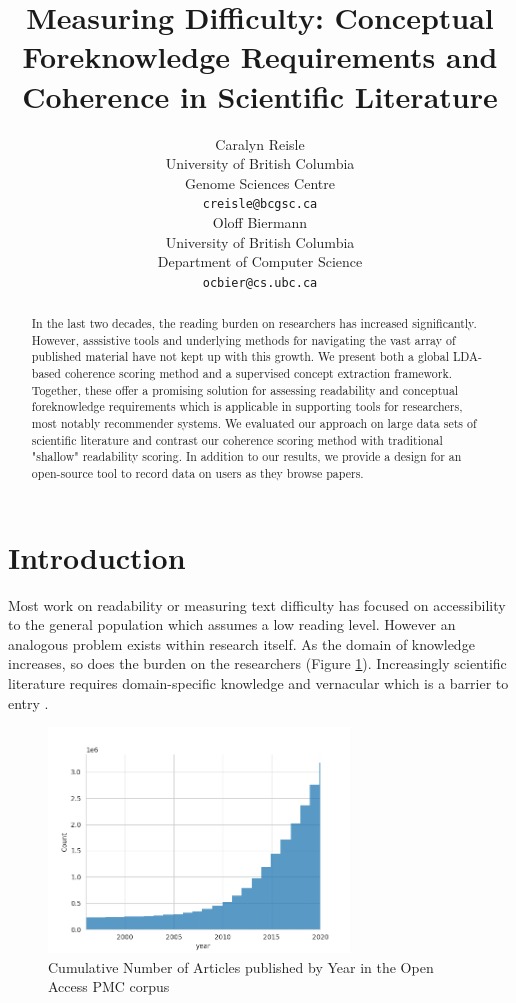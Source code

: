 \documentclass[11pt,a4paper]{article}
\title{Measuring Difficulty: Conceptual Foreknowledge Requirements and Coherence in Scientific Literature
}
\author{Caralyn Reisle \\
  University of British Columbia \\
  Genome Sciences Centre \\
  \texttt{creisle@bcgsc.ca} \\\And
  Oloff Biermann \\
  University of British Columbia \\
  Department of Computer Science \\
  \texttt{ocbier@cs.ubc.ca} \\}
\date{}
\begin{document}
\maketitle
\begin{abstract}
In the last two decades, the reading burden on researchers has increased significantly. However, asssistive tools and underlying methods for navigating the vast array of published material have not kept up with this growth. We present both a global LDA-based coherence scoring method and a supervised concept extraction framework. Together, these offer a promising solution for assessing readability and conceptual foreknowledge requirements which is applicable in supporting tools for researchers, most notably recommender systems. We evaluated our approach on large data sets of scientific literature and contrast our coherence scoring method with traditional "shallow" readability scoring. In addition to our results, we provide a design for an open-source tool to record data on users as they browse papers. 
\end{abstract}

\section{Introduction}

Most work on readability or measuring text difficulty has focused on accessibility to the general population which assumes a low reading level. However an analogous problem exists within research itself. As the domain of knowledge increases, so does the burden on the researchers (Figure \ref{fig:articles-published}). Increasingly scientific literature requires domain-specific knowledge and vernacular which is a barrier to entry \cite{Plaven-Sigray2017-xb}.

\begin{figure}
    \centering
    \includegraphics[width=8cm]{images/cumulative-articles-published.png}
    \caption{Cumulative Number of Articles published by Year in the Open Access PMC corpus}
    \label{fig:articles-published}
\end{figure}
\end{document}
